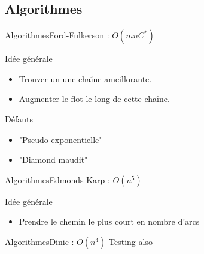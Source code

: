 \subsection{Algorithmes}
\begin{frame}{Algorithmes}{Ford-Fulkerson : $O(mnC^*)$}

\begin{block}{Idée générale}
\begin{itemize}
\item Trouver un une chaîne ameillorante.
\item Augmenter le flot le long de cette chaîne.
\end{itemize}
\end{block}

\begin{block}{Défauts}
\begin{itemize}
\item "Pseudo-exponentielle"
\item "Diamond maudit"
\end{itemize}
\end{block}

\end{frame}
\begin{frame}{Algorithmes}{Edmonds-Karp : $O(n^5)$}
\begin{block}{Idée générale}
\begin{itemize}
\item Prendre le chemin le plus court en nombre d'arcs
\end{itemize}
\end{block}
\end{frame}

\begin{frame}{Algorithmes}{Dinic : $O(n^4)$}
Testing also
\end{frame}
